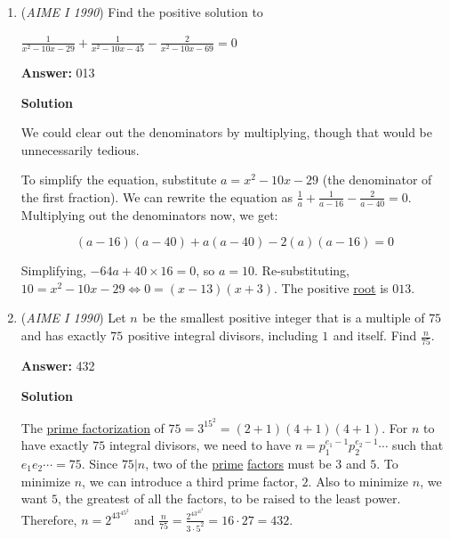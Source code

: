 \begin{enumerate}
 



\textbf{Solution 3}

As in above, we have $rs = 118r - 116s.$ This means that $rs + 116s - 118r = 0.$ Using SFFT we obtain $s(r+116) - 118(r+116) = -118 \cdot 116 \implies (s-118)(r+116) = -118 \cdot 116.$ Since $r+116$ is always positive, we know that $s-118$ must be negative. Therefore the maximum value of $s$ must be $\boxed{117}$ which indeed yields an integral value of $r.$



	\item (\textit{AIME I 1990}) Find the positive solution to


 $\frac 1{x^2-10x-29}+\frac1{x^2-10x-45}-\frac 2{x^2-10x-69}=0$

 \textbf{Answer: }013



\textbf{Solution}

We could clear out the denominators by multiplying, though that would be unnecessarily tedious.

 To simplify the equation, substitute $a = x^2 - 10x - 29$ (the denominator of the first fraction). We can rewrite the equation as $\frac{1}{a} + \frac{1}{a - 16} - \frac{2}{a - 40} = 0$. Multiplying out the denominators now, we get:

 
 \[(a - 16)(a - 40) + a(a - 40) - 2(a)(a - 16) = 0\]

 Simplifying, $-64a + 40 \times 16 = 0$, so $a = 10$. Re-substituting, $10 = x^2 - 10x - 29 \Longleftrightarrow 0 = (x - 13)(x + 3)$. The positive \href{https://artofproblemsolving.com/wiki/index.php?title=Root}{root} is $\boxed{013}$.

 


	\item (\textit{AIME I 1990}) Let $n^{}_{}$ be the smallest positive integer that is a multiple of $75_{}^{}$ and has exactly $75_{}^{}$ positive integral divisors, including $1_{}^{}$ and itself. Find $\frac{n}{75}$.


 
 \textbf{Answer: }432



\textbf{Solution}

The \href{https://artofproblemsolving.com/wiki/index.php?title=Prime\_factorization}{prime factorization} of $75 = 3^15^2 = (2+1)(4+1)(4+1)$. For $n$ to have exactly $75$ integral divisors, we need to have $n = p_1^{e_1-1}p_2^{e_2-1}\cdots$ such that $e_1e_2 \cdots = 75$. Since $75|n$, two of the \href{https://artofproblemsolving.com/wiki/index.php?title=Prime}{prime} \href{https://artofproblemsolving.com/wiki/index.php?title=Factor}{factors} must be $3$ and $5$. To minimize $n$, we can introduce a third prime factor, $2$. Also to minimize $n$, we want $5$, the greatest of all the factors, to be raised to the least power. Therefore, $n = 2^43^45^2$ and $\frac{n}{75} = \frac{2^43^45^2}{3 \cdot 5^2} = 16 \cdot 27 = \boxed{432}$.


\end{enumerate}
